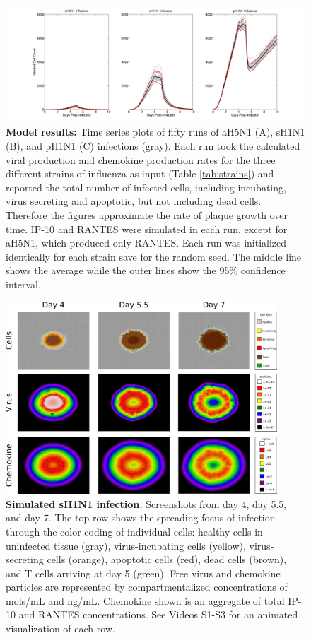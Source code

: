 \documentclass[10pt]{article}
\begin{document}
\begin{figure}[ht!]
\begin{center}
\includegraphics[width=\textwidth]{Figure_4}
 \end{center}
\caption{\textbf{Model results:} Time series plots of fifty runs of aH5N1 (A), sH1N1 (B), and pH1N1 (C) infections (gray). Each run took the calculated viral production and chemokine production rates for the three different strains of influenza as input (Table \ref{tab:strains}) and reported the total number of infected cells, including incubating, virus secreting and apoptotic, but not including dead cells.  Therefore the figures approximate the rate of plaque growth over time.  IP-10 and RANTES were simulated in each run, except for aH5N1, which  produced only RANTES.  Each run was initialized identically for each strain save for the random seed.  The middle line shows the average while the outer lines show the 95\% confidence interval.} 
 \label{fig:variance}
\end{figure}

\begin{figure}[!ht]
\begin{center}
\includegraphics[width=4in]{Figure_5}
 \end{center}
\caption{{\bf Simulated sH1N1 infection.} Screenshots from day 4, day 5.5, and day 7.  The top row shows the spreading focus of infection  through the color coding of individual cells:  healthy cells in uninfected tissue (gray),  virus-incubating cells (yellow), virus-secreting cells (orange), apoptotic cells (red), dead cells (brown), and T cells arriving at day 5 (green).  Free virus and chemokine particles are represented by compartmentalized concentrations of mols/mL and ng/mL.  Chemokine shown is an aggregate of total IP-10 and RANTES concentrations.  See Videos S1-S3 for an animated visualization of each row.} 
 \label{fig:cycells}
\end{figure}
\end{document}
